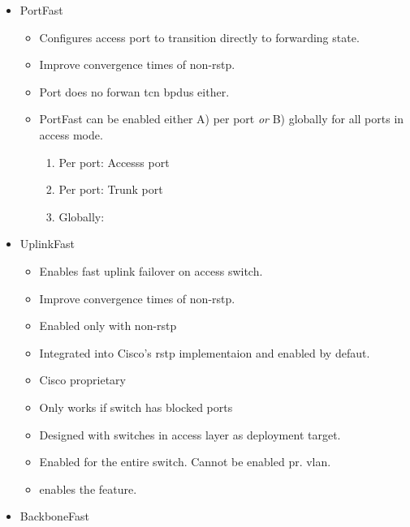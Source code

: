 \begin{itemize}
    \item PortFast
    \begin{itemize}
        \item Configures access port to transition directly to forwarding state.
        \item Improve convergence times of non-\gls{rstp}.
        \item Port does no forwan \gls{tcn} \gls{bpdu}s either.
        \item PortFast can be enabled either A) per port \textit{or} B) globally for all ports in access mode.
        \begin{enumerate}
            \item Per port: {\footnotesize Accesss port}\\
            \item Per port: {\footnotesize Trunk port}\\
            \item Globally:\\
        \end{enumerate}
    \end{itemize}
    \item UplinkFast
    \begin{itemize}
        \item Enables fast uplink failover on access switch.
        \item Improve convergence times of non-\gls{rstp}.
        \item Enabled only with non-\gls{rstp}
        \item Integrated into Cisco's \gls{rstp} implementaion and enabled by defaut.
        \item Cisco proprietary
        \item Only works if switch has blocked ports
        \item Designed with switches in access layer as deployment target.
        \item Enabled for the entire switch. Cannot be enabled pr. vlan.
        \item {} enables the feature.
    \end{itemize}
    \item BackboneFast
    \begin{itemize}

\end{itemize}
\end{itemize}
